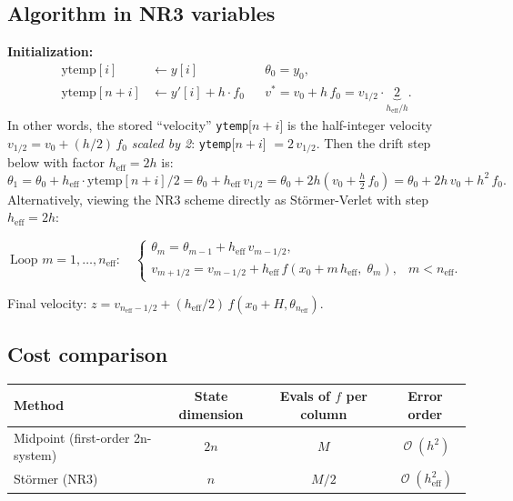 \documentclass[11pt]{article}
\DeclareMathOperator{\OO}{\mathcal{O}}
\begin{document}
\subsection{Algorithm in NR3 variables}

\textbf{Initialization:}
\begin{align*}
  \text{ytemp}[i]   &\leftarrow y[i]                && \theta_0 = y_0, \\
  \text{ytemp}[n+i] &\leftarrow y'[i] + h\cdot f_0  && v^* = v_0 + h\,f_0
                                                       = v_{1/2} \cdot
                                                       \underbrace{2}_{h_\text{eff}/h}.
\end{align*}
\noindent In other words, the stored ``velocity'' \texttt{ytemp}[$n+i$] is the
half-integer velocity $v_{1/2} = v_0 + (h/2)\,f_0$ \emph{scaled by 2}:
\texttt{ytemp}[$n+i$] $= 2\,v_{1/2}$.  Then the drift step below with factor
$h_\text{eff} = 2h$ is:
\[
  \theta_1 = \theta_0 + h_\text{eff} \cdot \text{ytemp}[n+i]/2
           = \theta_0 + h_\text{eff}\,v_{1/2}
           = \theta_0 + 2h\left(v_0 + \tfrac{h}{2}\,f_0\right)
           = \theta_0 + 2h\,v_0 + h^2\,f_0.
\]
Alternatively, viewing the NR3 scheme directly as Störmer-Verlet with step
$h_\text{eff} = 2h$:

\begin{equation}
  \label{eq:nr3-leapfrog}
  \text{Loop } m = 1, \ldots, n_\text{eff}:\quad
  \begin{cases}
    \theta_m = \theta_{m-1} + h_\text{eff}\,v_{m-1/2}, \\
    v_{m+1/2} = v_{m-1/2} + h_\text{eff}\,f(x_0 + m\,h_\text{eff},\;\theta_m),
      & m < n_\text{eff}.
  \end{cases}
\end{equation}

\noindent Final velocity:
$z = v_{n_\text{eff}-1/2} + (h_\text{eff}/2)\,f(x_0 + H, \theta_{n_\text{eff}})$.

\subsection{Cost comparison}

\begin{center}
\begin{tabular}{@{}lccc@{}}
  \toprule
  Method & State dimension & Evals of $f$ per column & Error order \\
  \midrule
  Midpoint (first-order 2n-system) & $2n$ & $M$   & $\OO(h^2)$ \\
  Störmer (NR3)                    & $n$  & $M/2$ & $\OO(h_\text{eff}^2)$ \\
  \bottomrule
\end{tabular}
\end{center}
\end{document}
